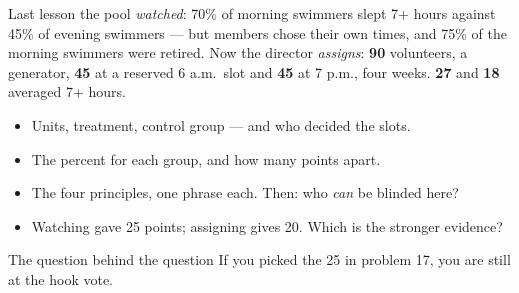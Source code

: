 \documentclass[aspectratio=169, 11pt]{beamer}
\begin{document}
\begin{frame}[t, plain]
  Last lesson the pool \emph{watched}: 70\% of morning swimmers slept 7+ hours against 45\% of
  evening swimmers --- but members chose their own times, and 75\% of the morning swimmers were
  retired. Now the director \emph{assigns}: \textbf{90} volunteers, a generator, \textbf{45} at
  a reserved 6 a.m.\ slot and \textbf{45} at 7 p.m., four weeks. \textbf{27} and \textbf{18}
  averaged 7+ hours.
  \begin{itemize}\setlength{\itemsep}{4pt}
    \item[14.] Units, treatment, control group --- and who decided the slots.
    \item[15.] The percent for each group, and how many points apart.
    \item[16.] The four principles, one phrase each. Then: who \emph{can} be blinded here?
    \item[17.] Watching gave 25 points; assigning gives 20. Which is the stronger evidence?
  \end{itemize}
  \begin{block}{The question behind the question}
    If you picked the 25 in problem 17, you are still at the hook vote.
  \end{block}
\end{frame}
\end{document}
